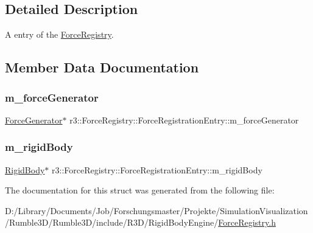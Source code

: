 \subsection{Detailed Description}
A entry of the \mbox{\hyperlink{classr3_1_1_force_registry}{Force\+Registry}}. 

\subsection{Member Data Documentation}
\mbox{\label{structr3_1_1_force_registry_1_1_force_registration_entry_aa2af182d8c92d8da8d6045ea4f4a5e16}} 
\subsubsection{\texorpdfstring{m\+\_\+force\+Generator}{m\_forceGenerator}}
{\footnotesize\ttfamily \mbox{\hyperlink{classr3_1_1_force_generator}{Force\+Generator}}$\ast$ r3\+::\+Force\+Registry\+::\+Force\+Registration\+Entry\+::m\+\_\+force\+Generator}

\mbox{\label{structr3_1_1_force_registry_1_1_force_registration_entry_a103ff58c0c8f46f2ed1927976bc5dc87}} 
\subsubsection{\texorpdfstring{m\+\_\+rigid\+Body}{m\_rigidBody}}
{\footnotesize\ttfamily \mbox{\hyperlink{classr3_1_1_rigid_body}{Rigid\+Body}}$\ast$ r3\+::\+Force\+Registry\+::\+Force\+Registration\+Entry\+::m\+\_\+rigid\+Body}



The documentation for this struct was generated from the following file\+:\begin{DoxyCompactItemize}
\item 
D\+:/\+Library/\+Documents/\+Job/\+Forschungsmaster/\+Projekte/\+Simulation\+Visualization/\+Rumble3\+D/\+Rumble3\+D/include/\+R3\+D/\+Rigid\+Body\+Engine/\mbox{\hyperlink{_force_registry_8h}{Force\+Registry.\+h}}\end{DoxyCompactItemize}
